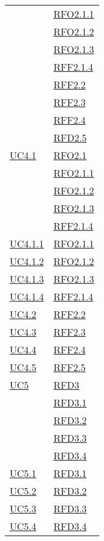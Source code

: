 \begin{longtable}{|>{\centering}m{5cm}|m{5cm}<{\centering}|}
& \hyperlink{RFO2.1.1}{RFO2.1.1}\\
& \hyperlink{RFO2.1.2}{RFO2.1.2}\\
& \hyperlink{RFO2.1.3}{RFO2.1.3}\\
& \hyperlink{RFF2.1.4}{RFF2.1.4}\\
& \hyperlink{RFF2.2}{RFF2.2}\\
& \hyperlink{RFF2.3}{RFF2.3}\\
& \hyperlink{RFF2.4}{RFF2.4}\\
& \hyperlink{RFF2.5}{RFD2.5}\\ \hline
\hyperlink{UC4.1}{UC4.1} & \hyperlink{RFO2.1}{RFO2.1}\\
& \hyperlink{RFO2.1.1}{RFO2.1.1}\\
& \hyperlink{RFO2.1.2}{RFO2.1.2}\\
& \hyperlink{RFO2.1.3}{RFO2.1.3}\\
& \hyperlink{RFF2.1.4}{RFF2.1.4}\\ \hline
\hyperlink{UC4.1.1}{UC4.1.1} & \hyperlink{RFO2.1.1}{RFO2.1.1}\\ \hline
\hyperlink{UC4.1.2}{UC4.1.2} & \hyperlink{RFO2.1.2}{RFO2.1.2}\\ \hline
\hyperlink{UC4.1.3}{UC4.1.3} & \hyperlink{RFO2.1.3}{RFO2.1.3}\\ \hline
\hyperlink{UC4.1.4}{UC4.1.4} & \hyperlink{RFF2.1.4}{RFF2.1.4}\\ \hline
\hyperlink{UC4.2}{UC4.2} & \hyperlink{RFF2.2}{RFF2.2}\\ \hline
\hyperlink{UC4.3}{UC4.3} & \hyperlink{RFF2.3}{RFF2.3}\\ \hline
\hyperlink{UC4.4}{UC4.4} & \hyperlink{RFF2.4}{RFF2.4}\\ \hline
\hyperlink{UC4.5}{UC4.5} & \hyperlink{RFF2.5}{RFF2.5}\\ \hline
\hyperlink{UC5}{UC5} & \hyperlink{RFD3}{RFD3}\\
& \hyperlink{RFD3.1}{RFD3.1}\\
& \hyperlink{RFD3.2}{RFD3.2}\\
& \hyperlink{RFD3.3}{RFD3.3}\\
& \hyperlink{RFD3.4}{RFD3.4}\\\hline
\hyperlink{UC5.1}{UC5.1} & \hyperlink{RFD3.1}{RFD3.1}\\ \hline
\hyperlink{UC5.2}{UC5.2} & \hyperlink{RFD3.2}{RFD3.2}\\ \hline
\hyperlink{UC5.3}{UC5.3} & \hyperlink{RFD3.3}{RFD3.3}\\ \hline
\hyperlink{UC5.4}{UC5.4} & \hyperlink{RFD3.4}{RFD3.4}\\ \hline

\end{longtable}
